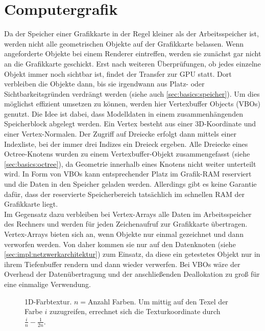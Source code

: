 \section{Computergrafik}
\label{sec:basics:computergrafik}
Da der Speicher einer Grafikkarte in der Regel kleiner als der Arbeitsspeicher ist, werden nicht alle geometrischen Objekte auf der Grafikkarte belassen. Wenn angeforderte Objekte bei einem Renderer eintreffen, werden sie zunächst gar nicht an die Grafikkarte geschickt. Erst nach weiteren Überprüfungen, ob jedes einzelne Objekt immer noch sichtbar ist, findet der Transfer zur GPU statt. Dort verbleiben die Objekte dann, bis sie irgendwann aus Platz- oder Sichtbarkeitsgründen verdrängt werden (siehe auch \ref{sec:basics:speicher}). Um dies möglichst effizient umsetzen zu können, werden hier Vertexbuffer Objects (VBOs) genutzt. Die Idee ist dabei, dass Modelldaten in einem zusammenhängenden Speicherblock abgelegt werden. Ein Vertex besteht aus einer 3D-Koordinate und einer Vertex-Normalen. Der Zugriff auf Dreiecke erfolgt dann mittels einer Indexliste, bei der immer drei Indizes ein Dreieck ergeben. Alle Dreiecke eines Octree-Knotens wurden zu einem Vertexbuffer-Objekt zusammengefasst (siehe \ref{sec:basics:octree}), da Geometrie innerhalb eines Knotens nicht weiter unterteilt wird. In Form von VBOs kann entsprechender Platz im Grafik-RAM reserviert und die Daten in den Speicher geladen werden. Allerdings gibt es keine Garantie dafür, dass der reservierte Speicherbereich tatsächlich im schnellen RAM der Grafikkarte liegt.\\
Im Gegensatz dazu verbleiben bei Vertex-Arrays alle Daten im Arbeitsspeicher des Rechners und werden für jeden Zeichenaufruf zur Grafikkarte übertragen. Vertex-Arrays bieten sich an, wenn Objekte nur einmal gezeichnet und dann verworfen werden. Von daher kommen sie nur auf den Datenknoten (siehe \ref{sec:impl:netzwerkarchitektur}) zum Einsatz, da diese ein getestetes Objekt nur in ihrem Tiefenbuffer rendern und dann wieder verwerfen. Bei VBOs wäre der Overhead der Datenübertragung und der anschließenden Deallokation zu groß für eine einmalige Verwendung.
\begin{figure}
  \centering
  
  \caption{1D-Farbtextur. $n=$Anzahl Farben. Um mittig auf den Texel der Farbe $i$ zuzugreifen, errechnet sich die Texturkoordinate durch $\frac{i}{n}-\frac{1}{2n}$. }
  \label{fig:basics:1dtexture}
\end{figure}

